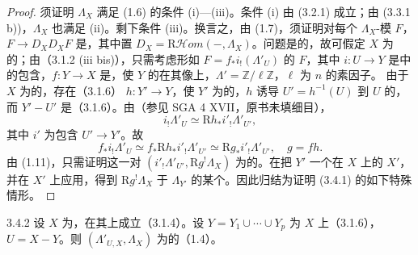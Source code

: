 \begin{proof}
须证明 $\Lambda_X$ 满足 (1.6) 的条件 (i)—(iii)。条件 (i) 由 (3.2.1) 成立；由 (3.3.1 b))，$\Lambda_X$ 也满足 (ii)。剩下条件 (iii)。换言之，由 (1.7)，须证明对每个 $\Lambda_X$-模 $F$， $F\to D_XD_XF$ 是，其中置 $D_X=\mathrm R\mathscr Hom(-,\Lambda_X)$。问题是的，故可假定 $X$ 为的；由（3.1.2 (iii bis)），只需考虑形如 $F=f_*i_!(\Lambda'_U)$ 的 $F$，其中 $i:U\to Y$ 是中的包含，$f:Y\to X$ 是，使 $Y$ 的在其像上，$\Lambda'=\mathbb Z/\ell\mathbb Z$，$\ell$ 为 $n$ 的素因子。
由于 $X$ 为的，存在（3.1.6） $h:Y'\to Y$，使 $Y'$ 为的，$h$ 诱导 $U'=h^{-1}(U)$ 到 $U$ 的，而 $Y'-U'$ 是（3.1.6）。由（参见 SGA 4 XVII，原书未填细目），
\[
i_!\Lambda'_U\simeq\mathrm Rh_*i'_!\Lambda'_{U'},
\]
其中 $i'$ 为包含 $U'\to Y'$。故
\[
f_*i_!\Lambda'_U\simeq f_*\mathrm Rh_*i'_!\Lambda'_{U'}\simeq\mathrm Rg_*i'_!\Lambda'_{U'},\quad g=fh.
\]
由 (1.11)，只需证明这一对
$(i'_!\Lambda'_{U'},\mathrm Rg^!\Lambda_X)$ 为的。在把 $Y'$ 一个在 $X$ 上的 $X'$，并在 $X'$ 上应用，得到 $\mathrm Rg^!\Lambda_X$ 于 $\Lambda_{Y'}$ 的某个。因此归结为证明 (3.4.1) 的如下特殊情形。
\end{proof}
\begin{SGAresult}{}{3.4.2}
设 $X$ 为，在其上成立（3.1.4）。设 $Y=Y_1\cup\cdots\cup Y_p$ 为 $X$ 上（3.1.6），$U=X-Y$。则 $(\Lambda'_{U,X},\Lambda_X)$ 为的（1.4）。
\end{SGAresult}
